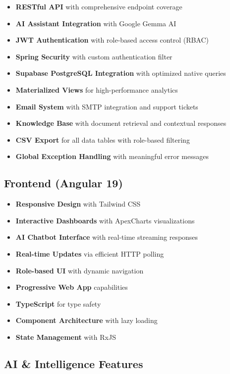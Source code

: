 \documentclass[11pt,a4paper]{article}
\begin{document}
\begin{itemize}[leftmargin=*]
    \item \textbf{RESTful API} with comprehensive endpoint coverage
    \item \textbf{AI Assistant Integration} with Google Gemma AI
    \item \textbf{JWT Authentication} with role-based access control (RBAC)
    \item \textbf{Spring Security} with custom authentication filter
    \item \textbf{Supabase PostgreSQL Integration} with optimized native queries
    \item \textbf{Materialized Views} for high-performance analytics
    \item \textbf{Email System} with SMTP integration and support tickets
    \item \textbf{Knowledge Base} with document retrieval and contextual responses
    \item \textbf{CSV Export} for all data tables with role-based filtering
    \item \textbf{Global Exception Handling} with meaningful error messages
\end{itemize}

\subsection{Frontend (Angular 19)}

\begin{itemize}[leftmargin=*]
    \item \textbf{Responsive Design} with Tailwind CSS
    \item \textbf{Interactive Dashboards} with ApexCharts visualizations
    \item \textbf{AI Chatbot Interface} with real-time streaming responses
    \item \textbf{Real-time Updates} via efficient HTTP polling
    \item \textbf{Role-based UI} with dynamic navigation
    \item \textbf{Progressive Web App} capabilities
    \item \textbf{TypeScript} for type safety
    \item \textbf{Component Architecture} with lazy loading
    \item \textbf{State Management} with RxJS
\end{itemize}

\subsection{AI \& Intelligence Features}
\end{document}
